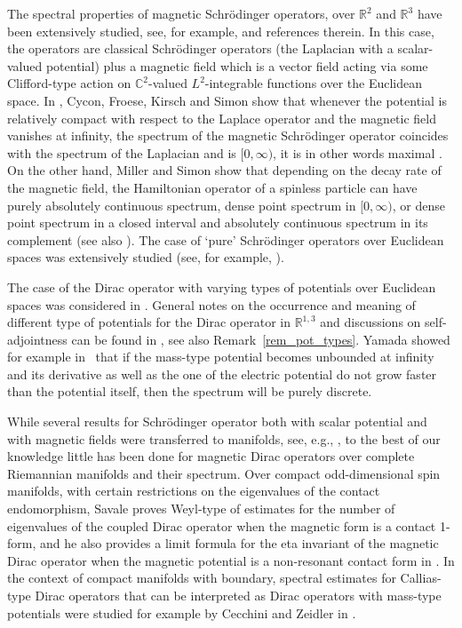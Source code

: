 \documentclass[pdftex]{sigma}
\numberwithin{equation}{section}
\begin{document}
The spectral properties of magnetic Schr\"odinger operators, over $\mathbb{R}^2$ and $\mathbb{R}^3$ have been extensively studied, see, for example, \cite{CFKS, Helffer, shi} and references therein. In this case, the operators are classical Schr\"odinger operators (the Laplacian with a scalar-valued potential) plus a magnetic field which is a vector field acting via some Clifford-type action on $\mathbb C^2$-valued $L^2$-integrable functions over the Euclidean space. In \cite{CFKS}, Cycon, Froese, Kirsch and Simon show that whenever the potential is relatively compact with respect to the
Laplace operator and the magnetic field vanishes at infinity, the spectrum of the magnetic Schr\"odinger operator coincides with the spectrum of the Laplacian and is $[0,\infty)$, it is in other words maximal \cite[Theorem~6.1]{CFKS}. On the other hand, Miller and Simon show that depending on the decay rate of the magnetic field, the Hamiltonian operator of a spinless particle can have purely absolutely continuous spectrum, dense point spectrum in $[0,\infty)$, or dense point spectrum in a closed interval and absolutely continuous spectrum in its complement \cite{MS} (see also \cite[Theorem~6.2]{CFKS}). The case of `pure' Schr\"odinger operators over Euclidean spaces was extensively studied (see, for example, \cite{Agmon, simon}).

The case of the Dirac operator with varying types of potentials over Euclidean spaces was considered in \cite{HNW, Yamada}. General notes on the occurrence and meaning of different type of potentials for the Dirac operator in ${\mathbb R}^{1,3}$ and discussions on self-adjointness can be found in \cite[Sections~4.2 and~4.3]{Thaller}, see also Remark~\ref{rem_pot_types}. Yamada showed for example in~\cite{Yamada} that if the mass-type potential becomes unbounded at infinity and its derivative as well as the one of the electric potential do not grow faster than the potential itself, then the spectrum will be purely discrete.

While several results for Schr\"odinger operator both with scalar potential and with magnetic fields were transferred to manifolds, see, e.g., \cite{shi2, Shubin}, to the best of our knowledge little has been done for magnetic Dirac operators over complete Riemannian manifolds and their spectrum. Over compact odd-dimensional spin manifolds, with certain restrictions on the eigenvalues of the contact endomorphism, Savale proves Weyl-type of estimates for the number of eigenvalues of the coupled Dirac operator when the magnetic form is a contact 1-form, and he also provides a limit formula for the eta invariant of the magnetic Dirac operator when the magnetic potential is a non-resonant contact form in \cite{sav, sav2}. In the context of compact manifolds with boundary, spectral estimates for Callias-type Dirac operators that can be interpreted as Dirac operators with mass-type potentials were studied for example by Cecchini and Zeidler in \cite{CZ}.
\end{document}
